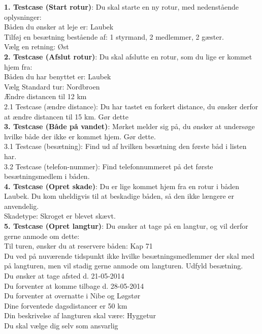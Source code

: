 \label{bil:usability}

\textbf{1. Testcase (Start rotur)}: Du skal starte en ny rotur, med nedenstående oplysninger:\\

Båden du ønsker at leje er: Laubek\\ 
Tilføj en besætning bestående af: 1 styrmand, 2 medlemmer, 2 gæster.\\
Vælg en retning: Øst\\

\textbf{2. Testcase (Afslut rotur)}: Du skal afslutte en rotur, som du lige er kommet hjem fra:\\

Båden du har benyttet er: Laubek\\
Vælg Standard tur: Nordbroen\\
Ændre distancen til 12 km\\

2.1 Testcase (ændre distance): Du har tastet en forkert distance, du ønsker derfor at ændre distancen til 15 km. Gør dette\\

\textbf{3. Testcase (Både på vandet)}: Mørket melder sig på, du ønsker at undersøge hvilke både der ikke er kommet hjem. Gør dette.\\

3.1 Testcase (besætning): Find ud af hvilken besætning den første båd i listen har.\\
3.2 Testcase (telefon-nummer): Find telefonnummeret på det første besætningsmedlem i båden.\\


\textbf{4. Testcase (Opret skade)}: Du er lige kommet hjem fra en rotur i båden Laubek. Du kom uheldigvis til at beskadige båden, så den ikke længere er anvendelig.\\

Skadetype: Skroget er blevet skævt.\\

\textbf{5. Testcase (Opret langtur)}: Du ønsker at tage på en langtur, og vil derfor gerne anmode om dette:\\

Til turen, ønsker du at reservere båden: Kap 71\\

Du ved på nuværende tidspunkt ikke hvilke besætningsmedlemmer der skal med på langturen, men vil stadig gerne anmode om langturen. Udfyld besætning.\\

Du ønsker at tage afsted d. 21-05-2014\\
Du forventer at komme tilbage d. 28-05-2014\\
Du forventer at overnatte i Nibe og Løgstør\\
Dine forventede dagsdistancer er 50 km\\
Din beskrivelse af langturen skal være: Hyggetur\\
Du skal vælge dig selv som ansvarlig